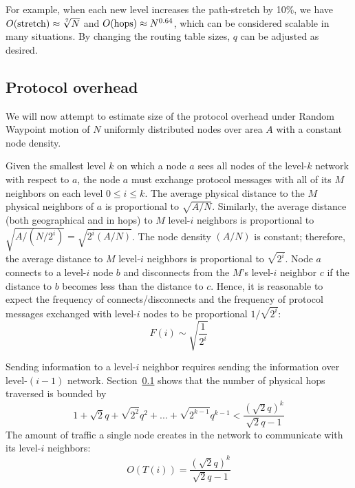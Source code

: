 \documentclass[conference]{IEEEtran}
\theoremstyle{definition}
\begin{document}
For example, when each new level increases the path-stretch by 10\%, we have $O({\rm stretch}) \approx \sqrt[7]{N}$ and $O({\rm hops}) \approx N^{0.64}$, which can be considered scalable in many situations. By changing the routing table sizes, $q$ can be adjusted as desired.


\subsection{Protocol overhead}
\label{sec:analysis:overhead}

We will now attempt to estimate size of the protocol overhead under Random Waypoint motion of $N$ uniformly distributed nodes over area $A$ with a constant node density.

Given the smallest level $k$ on which a node $a$ sees all nodes of the level-$k$ network with respect to $a$, the node $a$ must exchange protocol messages with all of its $M$ neighbors on each level $0 \le i \le k$. The average physical distance to the $M$ physical neighbors of $a$ is proportional to $\sqrt{A / N}$. Similarly, the average distance (both geographical and in hops) to $M$ level-$i$ neighbors is proportional to $\sqrt{A / (N / 2^i)} = \sqrt{2^i (A / N)}$. The node density $(A / N)$ is constant; therefore, the average distance to $M$ level-$i$ neighbors is proportional to $\sqrt{2^i}$. Node $a$ connects to a level-$i$ node $b$ and disconnects from the $M$'s level-$i$ neighbor $c$ if the distance to $b$ becomes less than the distance to $c$. Hence, it is reasonable to expect the frequency of connects/disconnects and the frequency of protocol messages exchanged with level-$i$ nodes to be proportional $1 / \sqrt{2^i}$:
%
\begin{equation*}
    F(i) \sim \sqrt{\frac{1}{2^i}}
\end{equation*}

Sending information to a level-$i$ neighbor requires sending the information over level-$(i - 1)$ network. Section~\ref{sec:analysis:overhead} shows that the number of physical hops traversed is bounded by 
%
\begin{equation*}
    1 + \sqrt{2} q + \sqrt{2^2} q^2  + ... + \sqrt{2^{k-1}} q^{k-1} < \frac{ (\sqrt{2}q)^k }{\sqrt{2}q - 1}
\end{equation*}
%
The amount of traffic a single node creates in the network to communicate with its level-$i$ neighbors:
%
\begin{equation*}
    O(T(i)) = \frac{ (\sqrt{2}q)^k }{\sqrt{2}q - 1}
\end{equation*}
\end{document}
